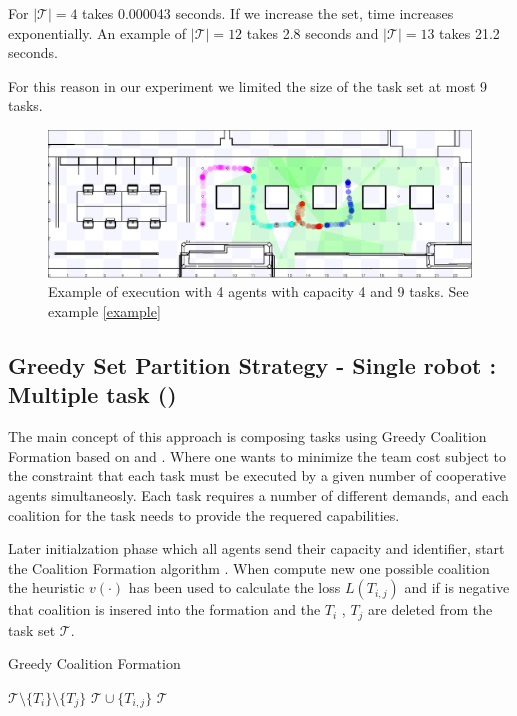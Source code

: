 For $|\mathcal{T}| = 4$ takes 0.000043 seconds. If we increase the set, time increases exponentially.
An example of $|\mathcal{T}| = 12$ takes 2.8 seconds and $|\mathcal{T}| = 13$ takes 21.2 seconds.

For this reason in our experiment we limited the size of the task set at most 9 tasks.

\begin{figure} [hbt]
  \centering
  \includegraphics[width=\textwidth]{img/opt.png}
  \caption{Example of execution \sps with 4 agents with capacity 4 and 9 tasks. See example \ref{example}}
  \label{fig:srst}
\end{figure}

\subsection{Greedy Set Partition Strategy - Single robot : Multiple task (\gsp)}
The main concept of this approach is composing tasks using Greedy Coalition Formation
based on \cite{cf_greedy} and \cite{cf_farinelli}. Where one wants to minimize the 
team cost subject to the constraint that each task must be executed by a given 
number of cooperative agents simultaneosly. Each task requires a number of different 
demands, and each coalition for the task needs to provide the requered capabilities.

Later initialzation phase which all agents send their capacity and identifier,
start the Coalition Formation algorithm \cite{cf_greedy}.
When compute new one possible coalition the heuristic  $v(\cdot)$ has been used to calculate 
the loss $L(T_{i,j})$ and if is negative that coalition is insered into the formation and the 
$T_i$ , $T_j$ are deleted from the task set $\mathcal{T}$.

\begin{algorithm}
\caption{Greedy Coalition Formation} \label{GCF}
\begin{algorithmic}[1]
  \State {}
       \State $\mathcal{T} \setminus \{ T_i\} \setminus \{T_j\}$ $\mathcal{T} \cup \{T_{i,j}\}$
  \EndIf
  \EndIf
\EndFor
\EndFor
{} $\mathcal{T}$
\EndProcedure
\end{algorithmic}
\end{algorithm}

